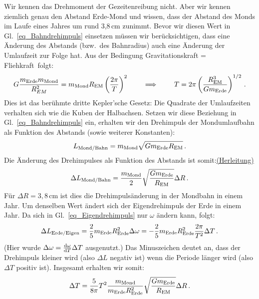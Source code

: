 Wir kennen das Drehmoment der Gezeitenreibung nicht. Aber wir kennen ziemlich genau
den Abstand Erde-Mond und wissen, dass der Abstand des Monds im Laufe eines Jahres
um rund 3,8\,cm zunimmt. Bevor wir diesen Wert in Gl.\ \ref{eq_Bahndrehimpuls} einsetzen
m\"ussen wir ber\"ucksichtigen, dass eine \"Anderung des Abstands (bzw.\ des Bahnradius)
auch eine \"Anderung der Umlaufzeit zur Folge hat. Aus der Bedingung \glqq Gravitationskraft = Fliehkraft\grqq\
folgt:
\begin{equation}
         G \frac{m_{\rm Erde} m_{\rm Mond}}{R_{EM}^2} = m_{\rm Mond} R_{\rm EM} \left( \frac{2\pi}{T} \right)^2  
          \hspace{0.8cm} \Longrightarrow \hspace{0.8cm}
          T =2 \pi  \left(  \frac{R_{\rm EM}^3}{G m_{\rm Erde}}   \right)^{1/2} \, .
\end{equation}
Dies ist das ber\"uhmte dritte Kepler'sche Gesetz: Die Quadrate der Umlaufzeiten verhalten sich wie
die Kuben der Halbachsen. Setzen wir diese Beziehung 
in Gl.\ \ref{eq_Bahndrehimpuls} ein, erhalten wir den Drehimpuls der Mondumlaufbahn
als Funktion des Abstands (sowie weiterer Konstanten):
\begin{equation}
\label{eq_BahnMond}
        L_{\rm Mond/Bahn} = m_{\rm Mond} \sqrt{G m_{\rm Erde} R_{\rm EM}} \, .
\end{equation}
Die \"Anderung des Drehimpulses als Funktion des Abstands ist somit:\hyperref[secB]{(Herleitung)}
\begin{equation}
        \Delta L_{\rm Mond/Bahn} = \frac{m_{\rm Mond}}{2} \sqrt{ \frac{G m_{\rm Erde}}{R_{\rm EM}}} \Delta R \, .
\end{equation}
F\"ur $\Delta R = 3,8$\,cm ist dies die Drehimpuls\"anderung in der Mondbahn in einem Jahr. 
Um denselben Wert \"andert sich der Eigendrehimpuls der Erde in einem Jahr. Da sich in Gl.\ \ref{eq_Eigendrehimpuls}
nur $\omega$ \"andern kann, folgt:
\begin{equation}
        \Delta L_{\rm Erde/Eigen} = \frac{2}{5} m_{\rm Erde} R_{\rm Erde}^2 \Delta \omega =
            - \frac{2}{5} m_{\rm Erde} R_{\rm Erde}^2 \frac{2 \pi }{T^2} \Delta T \, .
\end{equation}
(Hier wurde $\Delta \omega = \frac{{\rm d}\omega}{{\rm d}T} \Delta T$ ausgenutzt.) Das Minuszeichen deutet
an, dass der Drehimpuls kleiner wird (also $\Delta L$ negativ ist) wenn die Periode l\"anger wird (also $\Delta T$
positiv ist).  Insgesamt erhalten wir somit:
\begin{equation}
       \Delta T = \frac{5}{8 \pi} T^2  
                \frac{m_{\rm Mond}}{m_{\rm Erde}R_{\rm Erde}^2} \sqrt{ \frac{G m_{\rm Erde}}{R_{\rm EM}}} \Delta R \, .
\end{equation}

